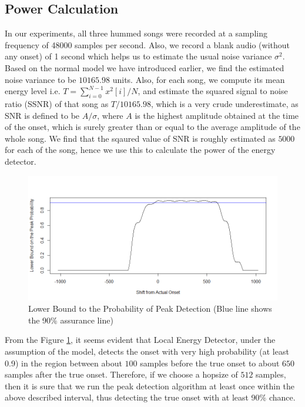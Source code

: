 \documentclass[10pt]{article}
\begin{document}
\subsection{Power Calculation}
\qquad In our experiments, all three hummed songs were recorded at a sampling frequency of 48000 samples per second. Also, we record a blank audio (without any onset) of 1 second which helps us to estimate the usual noise variance $\sigma^2$. Based on the normal model we have introduced earlier, we find the estimated noise variance to be $10165.98$ units. Also, for each song, we compute its mean energy level i.e. $T = \sum_{i=0}^{N-1}x^2[i]/N$, and estimate the squared signal to noise ratio (SSNR) of that song as $T/10165.98$, which is a very crude underestimate, as SNR is defined to be $A/\sigma$, where $A$ is the highest amplitude obtained at the time of the onset, which is surely greater than or equal to the average amplitude of the whole song. We find that the sqaured value of SNR is roughly estimated as $5000$ for each of the song, hence we use this to calculate the power of the energy detector.

\begin{figure}
    \centering
    \includegraphics[width = \textwidth]{power_energy.png}
    \caption{Lower Bound to the Probability of Peak Detection (Blue line shows the 90\% assurance line)}
    \label{fig:power_energy}
\end{figure}

From the Figure \ref{fig:power_energy}, it seems evident that Local Energy Detector, under the assumption of the model, detects the onset with very high probability (at least 0.9) in the region between about $100$ samples before the true onset to about $650$ samples after the true onset. Therefore, if we choose a hopsize of $512$ samples, then it is sure that we run the peak detection algorithm at least once within the above described interval, thus detecting the true onset with at least 90\% chance.
\end{document}
